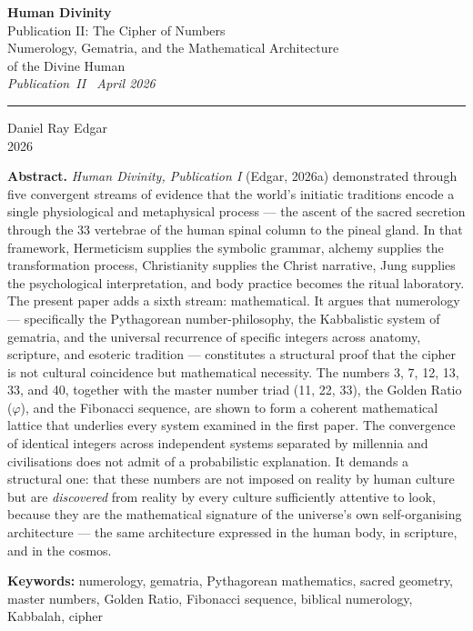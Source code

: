\documentclass[12pt, a4paper]{article}
\begin{document}

\begin{titlepage}
  \centering
  \vspace*{2cm}

  {\LARGE\bfseries Human Divinity}\\[0.8em]
  {\large Publication II: The Cipher of Numbers}\\[0.4em]
  {\large Numerology, Gematria, and the Mathematical Architecture\\
  of the Divine Human}\\[0.4em]
  {\normalsize\itshape Publication~II \textbullet\ April 2026}

  \vspace{2cm}
  \rule{0.5\linewidth}{0.5pt}
  \vspace{2cm}

  {\large Daniel Ray Edgar}\\[0.4em]
  {\normalsize 2026}

  \vfill

  \noindent\textbf{Abstract.}\quad
  \emph{Human Divinity, Publication I} (Edgar, 2026a) demonstrated through five
  convergent streams of evidence that the world's initiatic traditions encode
  a single physiological and metaphysical process — the ascent of the sacred
  secretion through the 33 vertebrae of the human spinal column to the pineal
  gland. In that framework, Hermeticism supplies the symbolic grammar, alchemy
  supplies the transformation process, Christianity supplies the Christ
  narrative, Jung supplies the psychological interpretation, and body practice
  becomes the ritual laboratory. The present paper adds a sixth stream:
  mathematical. It argues that
  numerology — specifically the Pythagorean number-philosophy, the Kabbalistic
  system of gematria, and the universal recurrence of specific integers across
  anatomy, scripture, and esoteric tradition — constitutes a structural proof
  that the cipher is not cultural coincidence but mathematical necessity. The
  numbers 3, 7, 12, 13, 33, and 40, together with the master number triad
  (11, 22, 33), the Golden Ratio ($\varphi$), and the Fibonacci sequence,
  are shown to form a coherent mathematical lattice that underlies every system
  examined in the first paper. The convergence of identical integers across
  independent systems separated by millennia and civilisations does not admit
  of a probabilistic explanation. It demands a structural one: that these
  numbers are not imposed on reality by human culture but are \emph{discovered}
  from reality by every culture sufficiently attentive to look, because they
  are the mathematical signature of the universe's own self-organising
  architecture — the same architecture expressed in the human body, in
  scripture, and in the cosmos.

  \vspace{0.5cm}
  \noindent\textbf{Keywords:} numerology, gematria, Pythagorean mathematics,
  sacred geometry, master numbers, Golden Ratio, Fibonacci sequence,
  biblical numerology, Kabbalah, cipher

\end{titlepage}
\end{document}
